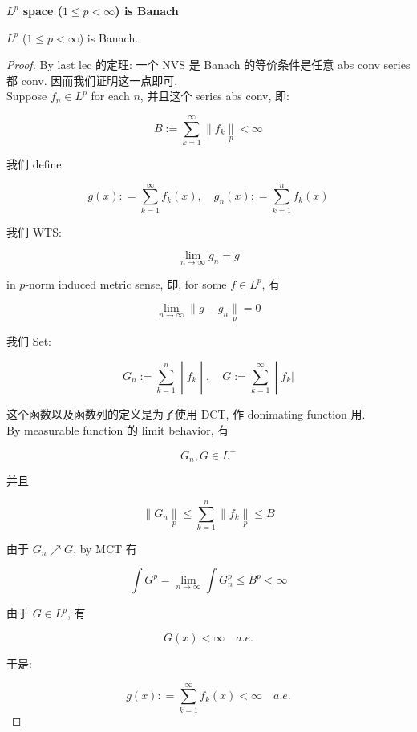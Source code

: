 \documentclass{qlnotes-export}
\begin{document}
\begin{theorem}{\protect{}\label{kn-l-p-space-1-leq-p-infty-is-banach}{\textbf{\(L^{p}\)
space (\(1 \leq p < \infty\)) is Banach}}}

\(L^{p}\) (\(1 \leq p < \infty\)) is Banach.

\end{theorem}

\begin{proof}

By last lec 的定理: 一个 NVS 是 Banach 的等价条件是任意 abs conv series 都 conv. 因而我们证明这一点即可.\\
Suppose \(f_{n} \in L^{p}\) for each \(n\), 并且这个 series abs conv, 即:

\[B := \sum\limits_{k = 1}^{\infty} \parallel f_{k}\underset{p}{\parallel} < \infty\]

我们 define:

\[g(x): = \sum\limits_{k = 1}^{\infty}f_{k}(x),\quad g_{n}(x): = \sum\limits_{k = 1}^{n}f_{k}(x)\]

我们 WTS:

\[\lim\limits_{n\rightarrow\infty}g_{n} = g\]

in \(p\)-norm induced metric sense, 即, for some \(f \in L^{p}\), 有

\[\lim\limits_{n\rightarrow\infty} \parallel g - g_{n}\underset{p}{\parallel} = 0\]

我们 Set:

\[\left. G_{n} := \sum\limits_{k = 1}^{n} \middle| f_{k} \middle| ,\quad G := \sum\limits_{k = 1}^{\infty} \middle| f_{k}| \right.\]

这个函数以及函数列的定义是为了使用 DCT, 作 donimating function 用.\\
By measurable function 的 limit behavior, 有

\[G_{n},G \in L^{+}\]

并且

\[\parallel G_{n}\underset{p}{\parallel} \leq \sum\limits_{k = 1}^{n} \parallel f_{k}\underset{p}{\parallel} \leq B\]

由于 \(G_{n}\operatorname{\nearrow ︎}G\), by MCT 有

\[\int G^{p} = \lim\limits_{n\rightarrow\infty}\int G_{n}^{p} \leq B^{p} < \infty\]

由于 \(G \in L^{p}\), 有

\[G(x) < \infty\quad a.e.\]

于是:

\[g(x): = \sum\limits_{k = 1}^{\infty}f_{k}(x) < \infty\quad a.e.\]


\end{proof}
\end{document}
